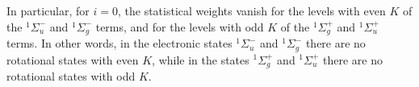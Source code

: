 In particular, for $i=0$, the statistical weights vanish for the levels with even $K$ of the ${}^1\Sigma_u^-$ and ${}^1\Sigma_g^-$ terms, and for the levels with odd $K$ of the ${}^1\Sigma_g^+$ and ${}^1\Sigma_u^+$ terms. In other words, in the electronic states ${}^1\Sigma_u^-$ and ${}^1\Sigma_g^-$ there are no rotational states with even $K$, while in the states ${}^1\Sigma_g^+$ and ${}^1\Sigma_u^+$ there are no rotational states with odd $K$.
